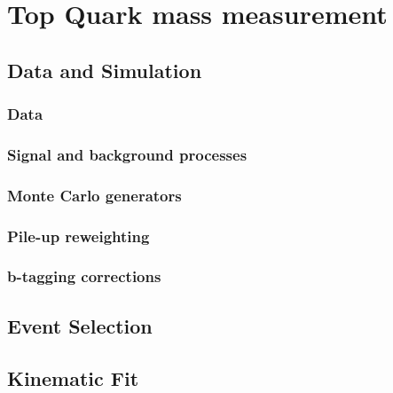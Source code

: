 
\chapter{Top Quark mass measurement}
\label{c:top_mass_analysis}
\ifpdf
    \graphicspath{{05_Mass_analysis/plots/}}
\else
    \graphicspath{{05_Mass_analysis/plots/EPS/}{05_Mass_analysis/plots/}}
\fi

\section{Data and Simulation}
\label{s_top_mass:data_and_simulation}

\subsection{Data}
\label{ss_top_mass:data}

\subsection{Signal and background processes}
\label{ss_top_mass:signal_and_background}

\subsection{Monte Carlo generators}
\label{ss_top_mass:MC_generators}

\subsection{Pile-up reweighting}
\label{ss_top_mass:pileup_reweithing}

\subsection{b-tagging corrections}
\label{ss_top_mass:btagging_corrections}

\section{Event Selection}
\label{s_top_mass:event_selection}

\section{Kinematic Fit}
\label{s_top_mass:kinematic_fit}

